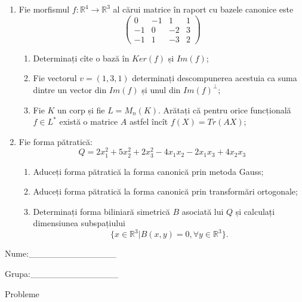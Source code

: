 \documentclass{article}
\begin{document}
\begin{enumerate}
 \item Fie morfismul $f:\mathbb{R}^4 \to \mathbb{R}^3$ al cărui matrice în raport cu bazele canonice este
$$\begin{pmatrix}
0&-1&1&1\\
-1&0&-2&3\\
-1&1&-3&2
\end{pmatrix}$$

\begin{enumerate}
\item Determinați cîte o bază în $Ker(f)$ și $Im(f)$;
\item Fie vectorul $v=(1,3,1)$ determinați descompunerea acestuia ca suma dintre un vector din $Im(f)$ și unul din $Im(f)^\perp$;
\item Fie $K$ un corp și fie $L=M_n(K)$. Arătați că pentru orice funcțională $f \in L^*$ există o matrice $A$ astfel încît $f(X)=Tr(AX)$;
\end{enumerate}
\item Fie forma pătratică:
$$Q= 2x_1^2+5x_2^2+2x_3^2-4x_1x_2-2x_1x_3+4x_2x_3$$

\begin{enumerate}
\item Aduceți forma pătratică la forma canonică prin metoda Gauss;
\item Aduceți forma pătratică la forma canonică prin transformări ortogonale;
\item Determinați forma biliniară simetrică $B$ asociată lui $Q$ și calculați dimensiunea subspațiului
$$\{x \in \mathbb{R}^3 | B(x,y)=0,\forall y \in \mathbb{R}^3\}.$$

\end{enumerate}
\end{enumerate}
\newpage
\begin{flushright}
Nume:\_\_\_\_\_\_\_\_\_\_\_\_\_\_
 
 
Grupa:\_\_\_\_\_\_\_\_\_\_\_\_\_\_
\end{flushright}
\begin{center}
\vspace{2cm}
{\Large Probleme}
\vspace{2cm}
\end{center}
\end{document}
